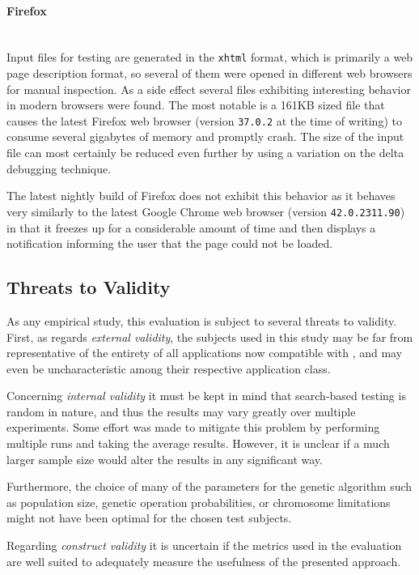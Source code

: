 \paragraph{Firefox} ~\\
Input files for testing \libxml are generated in the \texttt{xhtml} format, which is primarily a web page
description format, so several of them were opened in different web browsers for manual inspection. As a side
effect several files exhibiting interesting behavior in modern browsers were found. The most notable is a 161KB
sized file that causes the latest Firefox web browser (version \texttt{37.0.2} at the time of writing) to
consume several gigabytes of memory and promptly crash. The size of the input file can most certainly be
reduced even further by using a variation on the delta debugging technique\cite{zeller2002simplifying}. 

The latest nightly build of Firefox does not exhibit this behavior as it behaves very similarly to the 
latest Google Chrome web browser (version \texttt{42.0.2311.90}) in that it freezes up for a
considerable amount of time and then displays a notification informing the user that the page could not be
loaded.


\subsection{Threats to Validity}
As any empirical study, this evaluation is subject to several threats to validity.
First, as regards \emph{external validity}, the subjects used in this study may be far from representative of
the entirety of all applications now compatible with \xmlmate, and may even be uncharacteristic among their
respective application class.

Concerning \emph{internal validity} it must be kept in mind that search-based testing is random in nature, and
thus the results may vary greatly over multiple experiments. Some effort was made to mitigate this problem by
performing multiple runs and taking the average results. However, it is unclear if a much larger sample size
would alter the results in any significant way.

Furthermore, the choice of many of the parameters for the genetic algorithm such as population size,
genetic operation probabilities, or chromosome limitations might not have been optimal for the chosen test
subjects.

Regarding \emph{construct validity} it is uncertain if the metrics used in the evaluation are well suited
to adequately measure the usefulness of the presented approach.
 

